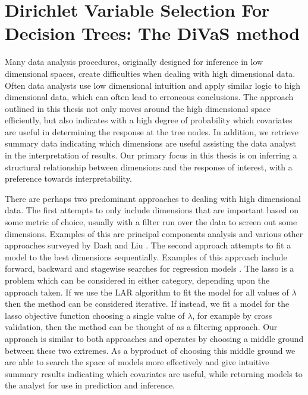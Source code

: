  \chapter{Dirichlet Variable Selection For Decision Trees: The DiVaS method}
\label{ch:var_select}

Many data analysis procedures, originally designed for inference in low dimensional spaces, create difficulties when dealing with high dimensional data.  Often data analysts use low dimensional intuition and apply similar logic to high dimensional data, which can often lead to erroneous conclusions. The approach outlined in this thesis not only moves around the high dimensional space efficiently, but also indicates with a high degree of probability which covariates are useful in determining the response at the tree nodes. In addition, we retrieve summary data indicating which dimensions are useful assisting the data analyst in the interpretation of results. Our primary focus in this thesis is on inferring a structural relationship between dimensions and the response of interest, with a preference towards interpretability. 

There are perhaps two predominant approaches to dealing with high dimensional data. The first attempts to only include dimensions that are important based on some metric of choice, usually with a filter run over the data to screen out some dimensions. Examples of this are principal components analysis \cite{tipping1999probabilistic} and various other approaches surveyed by Dash and Liu \cite{dash1997feature}. The second approach attempts to fit a model to the best dimensions sequentially. Examples of this approach include forward, backward and stagewise searches for regression models \cite{miller1984selection} \cite{myers1990classical} \cite{berk1978comparing}. The lasso \cite{tibshirani1996regression} is a problem which can be considered in either category, depending upon the approach taken. If we use the LAR algorithm to fit the model for all values of $\lambda$ then the method can be considered iterative. If instead, we fit a model for the lasso objective function choosing a single value of $\lambda$, for example by cross validation, then the method can be thought of as a filtering approach. Our approach is similar to both approaches and operates by choosing a middle ground between these two extremes. As a byproduct of choosing this middle ground we are able to search the space of models more effectively and give intuitive summary results indicating which covariates are useful, while returning models to the analyst for use in prediction and inference. 


